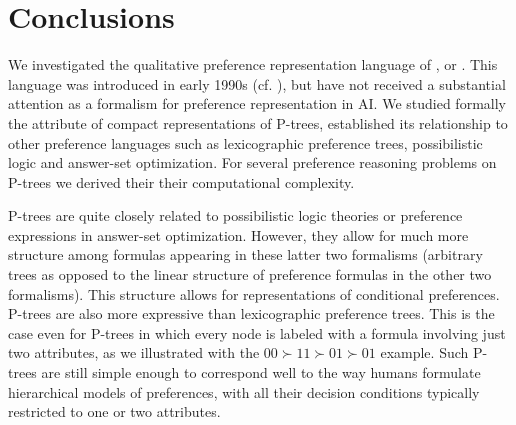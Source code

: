 %
%


\section{Conclusions}

We investigated the qualitative preference representation language of 
, or . This language was 
introduced in early 1990s (cf. \cite{fraser1993,fraser1994}), but have 
not received a substantial attention as a formalism for preference 
representation in AI. We studied formally the attribute of compact 
representations of
P-trees, established its relationship to other preference languages
such as lexicographic preference trees, possibilistic logic and
answer-set optimization. For several preference reasoning problems 
on P-trees we derived their their computational complexity.

P-trees are quite closely related to possibilistic logic theories or
preference expressions in answer-set optimization. However, they allow
for much more structure among formulas appearing in these latter two
formalisms (arbitrary trees as opposed to the linear structure of 
preference formulas in the other two formalisms). This structure allows 
for representations of conditional preferences. P-trees are also more
expressive than lexicographic preference trees. This is the case even 
for P-trees in which every node is labeled with a formula involving just
two attributes, as we illustrated with the $00\succ 11\succ 01\succ 01$ 
example. Such P-trees are still simple enough to correspond well to
the way humans formulate hierarchical models of preferences, with all
their decision conditions typically restricted to one or two attributes. 


